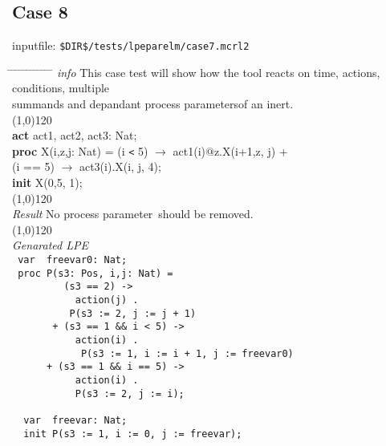 \documentclass[a4paper,10pt]{article}
\theoremstyle{plain}
\theoremstyle{definition}
\newcommand{\ti}{\textit}
\newcommand{\tb}{\textbf}
\newcommand{\pp}{process parameter}
\newcommand{\pps}{process parameters}
\newcommand{\tabw}{\hspace*{15.mm} \= \hspace*{20.mm} \= \hspace*{5.mm} \= \hspace*{5.mm} \= \hspace*{5.mm} \= \hspace*{5.mm}  \= \hspace*{5.mm}  \= \hspace*{5.mm}  \= \hspace*{5.mm} \= \hspace*{5.mm} \= \hspace*{5.mm}  \= \hspace*{5.mm}  \= \hspace*{5.mm}\kill}
\begin{document}
\subsection*{Case 8}
inputfile: \verb"$DIR$/tests/lpeparelm/case7.mcrl2"
\begin{tabbing}
\tabw
\ti{info} \> This case test will show how the tool reacts on time, actions, conditions, multiple \\
	\> summands and depandant \pps of an inert.\\
\line(1,0){120}\\
\tb{act}  \> act1, act2, act3: Nat;\\
\tb{proc} \> X(i,z,j: Nat) \>    = \>  (i \verb"<"  5) $\rightarrow$ act1(i)$@$z.X(i+1,z, j) +\\
          \>               \>  \> (i == 5) $\rightarrow$ act3(i).X(i, j, 4); \\
\tb{init} X(0,5, 1);\\
\line(1,0){120}\\
\ti{Result} \> No \pp\ should be removed.\\ 
\line(1,0){120}\\
\ti{Genarated LPE} \\
\>  \verb" var  freevar0: Nat;     "               \\                %
\>  \verb" proc P(s3: Pos, i,j: Nat) ="              \\              %
\>  \verb"         (s3 == 2) ->        "               \\             %
\>  \verb"           action(j) .        "                \\           %
\>  \verb"          P(s3 := 2, j := j + 1)"                \\        %
\>  \verb"       + (s3 == 1 && i < 5) ->   "                 \\       %
\>  \verb"           action(i) .            "                  \\     %
\>  \verb"            P(s3 := 1, i := i + 1, j := freevar0)"     \\   %
\>  \verb"      + (s3 == 1 && i == 5) -> "                         \\%
\>  \verb"           action(i) . "                 \\                 %
\>  \verb"           P(s3 := 2, j := i);"            \\               %
\>  \verb"       "                                     \\             %
\>  \verb"  var  freevar: Nat;"                          \\           %
\>  \verb"  init P(s3 := 1, i := 0, j := freevar);"        \\         %
\end{tabbing}
\end{document}
